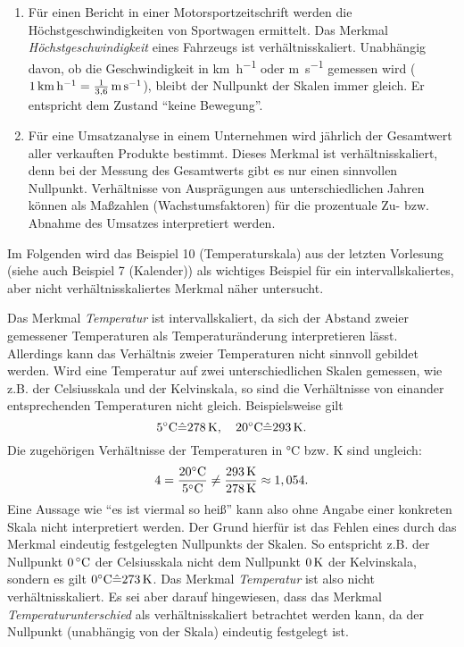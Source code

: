 \documentclass{lecture}
\begin{document}
    \begin{example}
        \begin{enumerate}
            \item Für einen Bericht in einer Motorsportzeitschrift werden die Höchstgeschwindigkeiten von Sportwagen ermittelt.
            Das Merkmal \emph{Höchstgeschwindigkeit} eines Fahrzeugs ist verhältnisskaliert.
            Unabhängig davon, ob die Geschwindigkeit in \si{\kilo\meter\per\hour} oder \si{\meter\per\second} gemessen wird (\(1\,\si{\kilo\meter\per\hour} = \frac{1}{3,6}\,\si{\meter\per\second}\)), bleibt der Nullpunkt der Skalen immer gleich.
            Er entspricht dem Zustand ``keine Bewegung''.
            \item Für eine Umsatzanalyse in einem Unternehmen wird jährlich der Gesamtwert aller verkauften Produkte bestimmt.
            Dieses Merkmal ist verhältnisskaliert, denn bei der Messung des Gesamtwerts gibt es nur einen sinnvollen Nullpunkt.
            Verhältnisse von Ausprägungen aus unterschiedlichen Jahren können als Maßzahlen (Wachstumsfaktoren) für die prozentuale Zu- bzw. Abnahme des Umsatzes interpretiert werden.
        \end{enumerate}
    \end{example}

    Im Folgenden wird das Beispiel 10 (Temperaturskala) aus der letzten Vorlesung (siehe auch Beispiel 7 (Kalender)) als wichtiges Beispiel für ein intervallskaliertes, aber nicht verhältnisskaliertes Merkmal näher untersucht.

    \begin{example}
        Das Merkmal \emph{Temperatur} ist intervallskaliert, da sich der Abstand zweier gemessener Temperaturen als Temperaturänderung interpretieren lässt.
        Allerdings kann das Verhältnis zweier Temperaturen nicht sinnvoll gebildet werden.
        Wird eine Temperatur auf zwei unterschiedlichen Skalen gemessen, wie z.B. der Celsiusskala und der Kelvinskala, so sind die Verhältnisse von einander entsprechenden Temperaturen nicht gleich.
        Beispielsweise gilt
        \[
            5\si{\degreeCelsius} \hat{=} 278\sis{\kelvin}, \quad 20\si{\degreeCelsius} \hat{=} 293\sis{\kelvin}.
        \]
        Die zugehörigen Verhältnisse der Temperaturen in \si{\degreeCelsius} bzw. \si{\kelvin} sind ungleich:
        \[
            4 = \frac{20\si{\degreeCelsius}}{5\si{\degreeCelsius}} \ne \frac{293\sis{\kelvin}}{278\sis{\kelvin}} \approx 1,054.
        \]
        Eine Aussage wie ``es ist viermal so heiß'' kann also ohne Angabe einer konkreten Skala nicht interpretiert werden.
        Der Grund hierfür ist das Fehlen eines durch das Merkmal eindeutig festgelegten Nullpunkts der Skalen.
        So entspricht z.B. der Nullpunkt \(0\sis{\degreeCelsius}\) der Celsiusskala nicht dem Nullpunkt \(0\,\si{\kelvin}\) der Kelvinskala, sondern es gilt \(0\si{\degreeCelsius} \hat{=} 273\sis{\kelvin}\).
        Das Merkmal \emph{Temperatur} ist also nicht verhältnisskaliert.
        Es sei aber darauf hingewiesen, dass das Merkmal \emph{Temperaturunterschied} als verhältnisskaliert betrachtet werden kann, da der Nullpunkt (unabhängig von der Skala) eindeutig festgelegt ist.
    \end{example}
\end{document}
